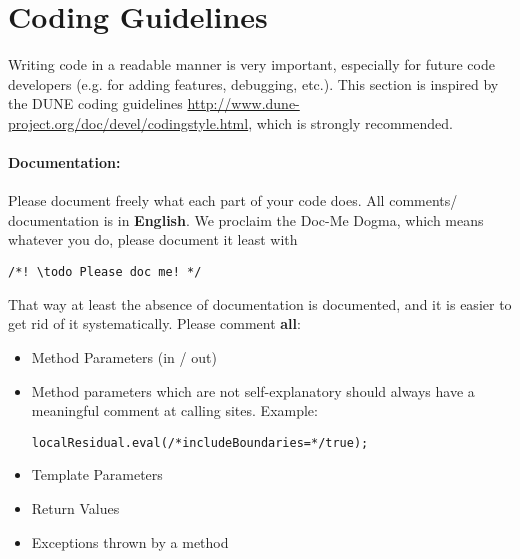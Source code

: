 \section{Coding Guidelines}
\label{sc_guidelines}
Writing code in a readable manner is very important, especially
for future code developers (e.g. for adding features, debugging, etc.).
This section is inspired by the DUNE coding guidelines
\url{http://www.dune-project.org/doc/devel/codingstyle.html}, which is strongly recommended.

\paragraph{Documentation:}
Please document freely what each part of your code does. All comments/ documentation
is in \textbf{English}.
We proclaim the Doc-Me Dogma, which means whatever you do, please document
it least with
\begin{lstlisting}[style=DumuxCode]
  /*! \todo Please doc me! */
\end{lstlisting}
That way at least the absence of documentation is documented, and it is easier
to get rid of it systematically. Please comment \textbf{all}:
\begin{itemize}
  \item Method Parameters (in / out)
  \item Method parameters which are not self-explanatory should always
        have a meaningful comment at calling sites. Example:
  \begin{lstlisting}[style=DumuxCode]
    localResidual.eval(/*includeBoundaries=*/true);
  \end{lstlisting}
  \item Template Parameters
  \item Return Values
  \item Exceptions thrown by a method
\end{itemize}

